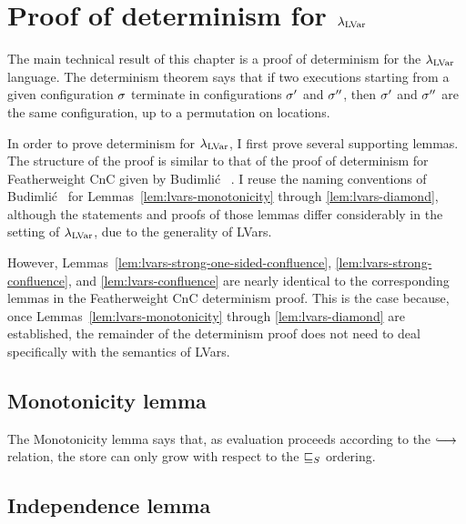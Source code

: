 \section{Proof of determinism for
  $\lambda_{\textrm{LVar}}$}\label{s:lvars-proof}

The main technical result of this chapter is a proof of determinism
for the $\lambda_{\textrm{LVar}}$ language.  The determinism theorem says that if
two executions starting from a given configuration $\sigma$ terminate
in configurations $\sigma'$ and $\sigma''$, then $\sigma'$ and $\sigma''$
are the same configuration, up to a permutation on locations.

In order to prove determinism for $\lambda_{\textrm{LVar}}$, I first prove several
supporting lemmas.  The structure of the proof is similar to that of
the proof of determinism for Featherweight CnC given by Budimli\'c
\etal~\cite{CnC}.  I reuse the naming conventions of Budimli\'c
\etal~for Lemmas~\ref{lem:lvars-monotonicity} through
\ref{lem:lvars-diamond}, although the statements and proofs of those
lemmas differ considerably in the setting of $\lambda_{\textrm{LVar}}$, due to the
generality of LVars.

However, Lemmas~\ref{lem:lvars-strong-one-sided-confluence},
\ref{lem:lvars-strong-confluence}, and \ref{lem:lvars-confluence} are
nearly identical to the corresponding lemmas in the Featherweight CnC
determinism proof.  This is the case because, once
Lemmas~\ref{lem:lvars-monotonicity} through \ref{lem:lvars-diamond}
are established, the remainder of the determinism proof does not need
to deal specifically with the semantics of LVars. 


\subsection{Monotonicity lemma}

The Monotonicity lemma says that, as evaluation proceeds according to
the $\parstepsto$ relation, the store can only grow with respect to
the $ \sqsubseteq_S $ ordering.

\LVarsLemMonotonicity


\subsection{Independence lemma}

